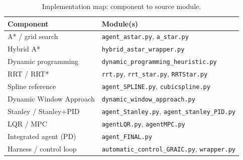 \documentclass[conference]{IEEEtran}
\begin{document}
\begin{table}[t]
\centering
\caption{Implementation map: component to source module.}
\label{tab:impl}
\footnotesize
\begin{tabular}{ll}
\toprule
Component & Module(s) \\
\midrule
A* / grid search        & \texttt{agent\_astar.py}, \texttt{a\_star.py} \\
Hybrid A*               & \texttt{hybrid\_astar\_wrapper.py} \\
Dynamic programming     & \texttt{dynamic\_programming\_heuristic.py} \\
RRT / RRT*              & \texttt{rrt.py}, \texttt{rrt\_star.py}, \texttt{RRTStar.py} \\
Spline reference        & \texttt{agent\_SPLINE.py}, \texttt{cubicspline.py} \\
Dynamic Window Approach & \texttt{dynamic\_window\_approach.py} \\
Stanley / Stanley+PID   & \texttt{agent\_Stanley.py}, \texttt{agent\_stanley\_PID.py} \\
LQR / MPC               & \texttt{agentLQR.py}, \texttt{agentMPC.py} \\
Integrated agent (PD)   & \texttt{agent\_FINAL.py} \\
Harness / control loop  & \texttt{automatic\_control\_GRAIC.py}, \texttt{wrapper.py} \\
\bottomrule
\end{tabular}
\end{table}
\end{document}
